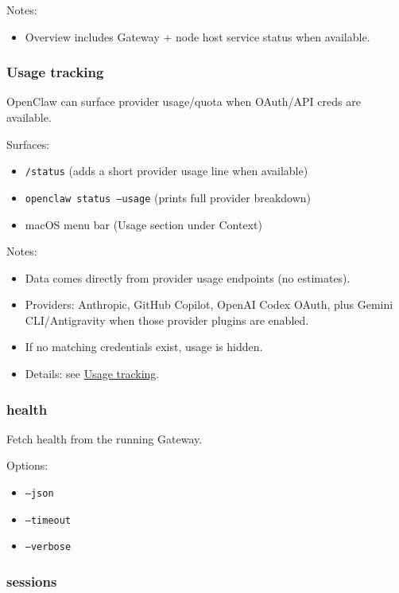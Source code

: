 Notes:

\begin{itemize}
  \item Overview includes Gateway + node host service status when available.
\end{itemize}


\subsubsection{Usage tracking}


OpenClaw can surface provider usage/quota when OAuth/API creds are available.

Surfaces:

\begin{itemize}
  \item \texttt{/status} (adds a short provider usage line when available)
  \item \texttt{openclaw status --usage} (prints full provider breakdown)
  \item macOS menu bar (Usage section under Context)
\end{itemize}


Notes:

\begin{itemize}
  \item Data comes directly from provider usage endpoints (no estimates).
  \item Providers: Anthropic, GitHub Copilot, OpenAI Codex OAuth, plus Gemini CLI/Antigravity when those provider plugins are enabled.
  \item If no matching credentials exist, usage is hidden.
  \item Details: see \href{/concepts/usage-tracking}{Usage tracking}.
\end{itemize}


\subsubsection{health}


Fetch health from the running Gateway.

Options:

\begin{itemize}
  \item \texttt{--json}
  \item \texttt{--timeout }
  \item \texttt{--verbose}
\end{itemize}


\subsubsection{sessions}


